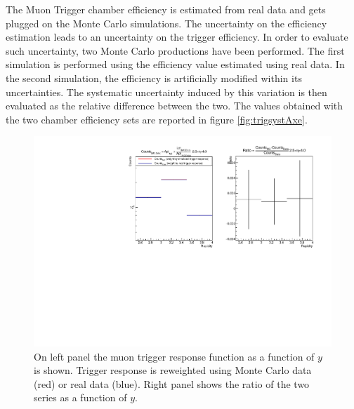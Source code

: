 The Muon Trigger chamber efficiency is estimated from real data and gets plugged on the Monte Carlo simulations.
The uncertainty on the efficiency estimation leads to an uncertainty on the trigger efficiency.
In order to evaluate such uncertainty, two Monte Carlo productions have been performed.
The first simulation is performed using the efficiency value estimated using real data.
In the second simulation, the efficiency is artificially modified within its uncertainties.
The systematic uncertainty induced by this variation is then evaluated as the relative difference between the two.
The values obtained with the two chamber efficiency sets are reported in figure \ref{fig:trigsystAxe}.

\begin{figure}[!htb]
\begin{center}
\includegraphics[width=0.9\linewidth]{Chapters/Analysis/Figs/ResponseFunctionSyst.pdf}
\caption{On left panel the muon trigger response function as a function of $y$ is shown. Trigger response is reweighted using Monte Carlo data (red) or real data (blue). Right panel shows the ratio of the two series as a function of $y$.}
\label{fig:trigsystRF}
\end{center}
\end{figure}

